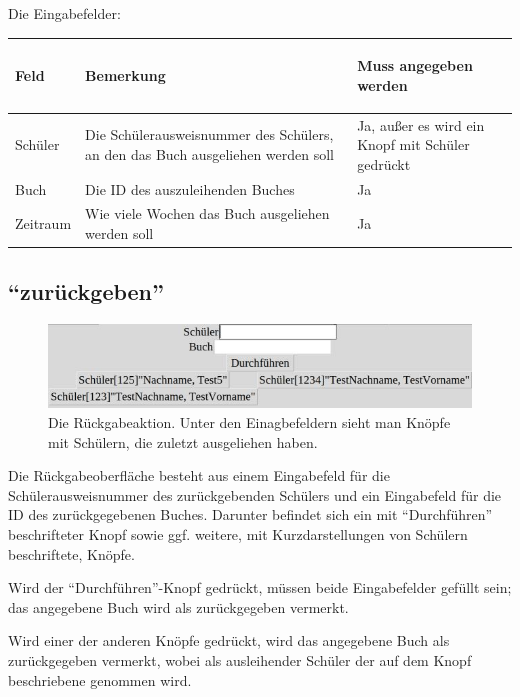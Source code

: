 Die Eingabefelder:

\begin{tabular}{|p{}|p{}|p{}|}\hline
\begin{center}Feld\end{center} & \begin{center}Bemerkung\end{center} & \begin{center}Muss angegeben werden\end{center}\\
\hline
Schüler & Die Schülerausweisnummer des Schülers, an den das Buch ausgeliehen werden soll & Ja, außer es wird ein Knopf mit Schüler gedrückt\\
\hline
Buch & Die ID des auszuleihenden Buches & Ja\\
\hline
Zeitraum & Wie viele Wochen das Buch ausgeliehen werden soll & Ja\\
\hline
\end{tabular}

\subsection{``zurückgeben''}
\label{subsec:detail:restitute}
\begin{figure}\includegraphics{images/gui2/restitute_with_people.jpg}\caption{Die Rückgabeaktion. Unter den Einagbefeldern sieht man Knöpfe mit Schülern, die zuletzt ausgeliehen haben.}\label{fig:restitute_with_people}\end{figure}


Die Rückgabeoberfläche besteht aus einem Eingabefeld für die Schülerausweisnummer des zurückgebenden Schülers und ein Eingabefeld für die ID des zurückgegebenen Buches. Darunter befindet sich ein mit ``Durchführen'' beschrifteter Knopf sowie ggf. weitere, mit Kurzdarstellungen von Schülern beschriftete, Knöpfe.

Wird der ``Durchführen''-Knopf gedrückt, müssen beide Eingabefelder gefüllt sein; das angegebene Buch wird als zurückgegeben vermerkt.

Wird einer der anderen Knöpfe gedrückt, wird das angegebene Buch als zurückgegeben vermerkt, wobei als ausleihender Schüler der auf dem Knopf beschriebene genommen wird.


